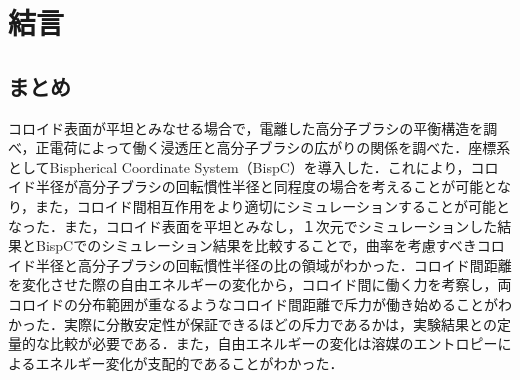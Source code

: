 \documentclass[10.5pt,a4j]{jarticle}
\begin{document}

\clearpage
\newpage
\section{結言}
\subsection{まとめ}
コロイド表面が平坦とみなせる場合で，電離した高分子ブラシの平衡構造を調べ，正電荷によって働く浸透圧と高分子ブラシの広がりの関係を調べた．座標系としてBispherical Coordinate System（BispC）を導入した．これにより，コロイド半径が高分子ブラシの回転慣性半径と同程度の場合を考えることが可能となり，また，コロイド間相互作用をより適切にシミュレーションすることが可能となった．また，コロイド表面を平坦とみなし，１次元でシミュレーションした結果とBispCでのシミュレーション結果を比較することで，曲率を考慮すべきコロイド半径と高分子ブラシの回転慣性半径の比の領域がわかった．コロイド間距離を変化させた際の自由エネルギーの変化から，コロイド間に働く力を考察し，両コロイドの分布範囲が重なるようなコロイド間距離で斥力が働き始めることがわかった．実際に分散安定性が保証できるほどの斥力であるかは，実験結果との定量的な比較が必要である．また，自由エネルギーの変化は溶媒のエントロピーによるエネルギー変化が支配的であることがわかった．
\end{document}
